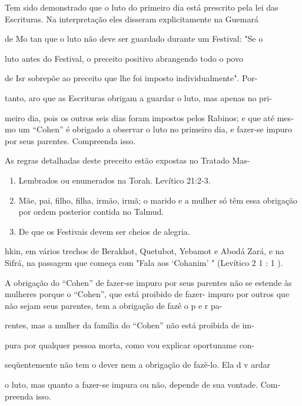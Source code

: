 Tem sido demonstrado que o luto do primeiro dia está prescrito pe­la lei
das Escrituras. Na interpretação eles disseram explicitamente na Guemará

de Mo tan que o luto não deve ser guardado durante um Festival: "Se o

luto antes do Festival, o preceito positivo abrangendo todo o povo

de Isr sobrepõe ao preceito que lhe foi imposto individualmente". Por-

tanto, aro que as Escrituras obrigam a guardar o luto, mas apenas no
pri-

meiro dia, pois os outros seis dias foram impostos pelos Rabinos; e que
até mes­mo um ``Cohen'' é obrigado a observar o luto no primeiro dia, e
fazer-se impu­ro por seus parentes. Compreenda isso.


As regras detalhadas deste preceito estão expostas no Tratado Mas-

\begin{enumerate}
\def\labelenumi{\arabic{enumi}.}
\setcounter{enumi}{60}
\item
 
 Lembrados ou enumerados na Torah. Levítico 21:2-3.
 
\item
 
 Mãe, pai, filho, filha, irmão, irmã; o marido e a mulher só têm essa
 obrigação por ordem poste­rior contida no Talmud.
 
\item
 
 De que os Festivais devem ser cheios de alegria.
 
\end{enumerate}

hkin, em vários trechos de Berakhot, Quetubot, Yebamot e Abodá Zará, e
na Sifrá, na passagem que começa com "Fala aos `Cohanim' " (Levítico 2 1
: 1 ).

A obrigação do ``Cohen'' de fazer-se impuro por seus parentes não se
estende às mulheres porque o ``Cohen'', que está proibido de fazer-
impu­ro por outros que não sejam seus parentes, tem a obrigação de fazê
o p e r pa-

rentes, mas a mulher da família do ``Cohen'' não está proibida de im-

pura por qualquer pessoa morta, como vou explicar oportuname con-

seqüentemente não tem o dever nem a obrigação de fazê-lo. Ela d v ardar

o luto, mas quanto a fazer-se impura ou não, depende de sua vontade.
Com­preenda isso.

